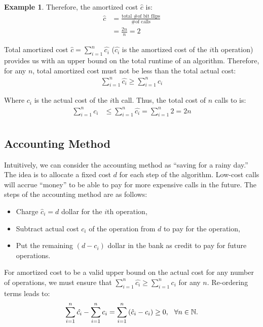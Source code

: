 \documentclass[11pt]{article}
\theoremstyle{definition}
\newtheorem{exmp}{Example}[section]
\begin{document}
\begin{exmp}
Therefore, the amortized cost $\hat{c}$ is:
\begin{align*}
\hat{c} &= \frac{\text{total \# of bit flips}}{\text{\# of calls}} \\
&= \frac{2n}{n} = 2
\end{align*}

Total amortized cost $\hat{c} = \sum_{i=1}^n \hat{c_i}$ ($\hat{c_i}$ is the amortized cost of the $i$th operation) provides us with an upper bound on the total runtime of an algorithm.  Therefore, for any $n$, total amortized cost must not
be less than the total actual cost:
\begin{align*}
\sum_{i=1}^{n}\hat{c_i} \ge \sum_{i=1}^{n} c_i
\end{align*}

Where $c_i$ is the actual cost of the $i$th call.  Thus, the total cost of $n$ calls to  is:
\begin{align*}
\sum_{i=1}^n c_i &\le \sum_{i=1}^n \hat{c_i} = \sum_{i=1}^n 2 = 2n\\
\end{align*}
\end{exmp}

\subsection{Accounting Method}
\label{sub:accounting}
Intuitively, we can consider the accounting method as ``saving for a rainy day.''
The idea is to allocate a fixed cost $d$ for each step of the algorithm.  Low-cost
calls will accrue ``money'' to be able to pay for more expensive calls in the future.  The steps of the accounting method are as follows:

\begin{itemize}
\item Charge $\hat{c}_i = d$ dollar for the $i$th operation,
\item Subtract actual cost $c_i$ of the operation from $d$ to pay for the operation,
\item Put the remaining $(d-c_i)$ dollar in the bank as credit to pay for future operations.
\end{itemize}

For amortized cost to be a valid upper bound on the actual cost for any number of operations, we must ensure that $\sum_{i=1}^n \hat{c_i} \ge \sum_{i=1}^n c_i$ for any $n$.  Re-ordering terms leads to:
\begin{eqnarray*}
\sum_{i=1}^{n}{\hat{c_i}} - \sum_{i=1}^{n}c_i = \sum_{i=1}^n \left(\hat{c}_i - c_i\right) \ge 0, \hspace{0.25cm} \forall n \in \mathbb{N}.
\end{eqnarray*}
\end{document}
